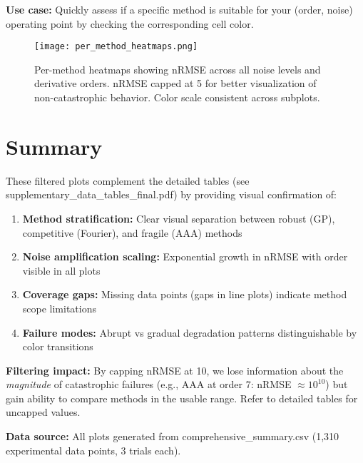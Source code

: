 \documentclass[11pt]{article}
\begin{document}
\textbf{Use case:} Quickly assess if a specific method is suitable for your (order, noise) operating point by checking the corresponding cell color.

\begin{figure}[p]
\centering
\texttt{[image: per\_method\_heatmaps.png]}
\caption{Per-method heatmaps showing nRMSE across all noise levels and derivative orders. nRMSE capped at 5 for better visualization of non-catastrophic behavior. Color scale consistent across subplots.}
\label{fig:per_method}
\end{figure}

\clearpage


\section*{Summary}

These filtered plots complement the detailed tables (see supplementary\_data\_tables\_final.pdf) by providing visual confirmation of:

\begin{enumerate}
    \item \textbf{Method stratification:} Clear visual separation between robust (GP), competitive (Fourier), and fragile (AAA) methods
    \item \textbf{Noise amplification scaling:} Exponential growth in nRMSE with order visible in all plots
    \item \textbf{Coverage gaps:} Missing data points (gaps in line plots) indicate method scope limitations
    \item \textbf{Failure modes:} Abrupt vs gradual degradation patterns distinguishable by color transitions
\end{enumerate}

\textbf{Filtering impact:} By capping nRMSE at 10, we lose information about the \emph{magnitude} of catastrophic failures (e.g., AAA at order 7: nRMSE $\approx 10^{10}$) but gain ability to compare methods in the usable range. Refer to detailed tables for uncapped values.

\textbf{Data source:} All plots generated from comprehensive\_summary.csv (1,310 experimental data points, 3 trials each).
\end{document}

